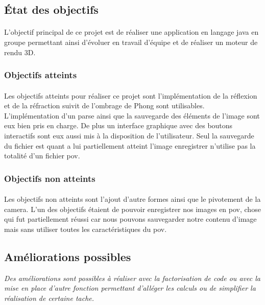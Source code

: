 \documentclass[12pt]{article}
\begin{document}
		\subsection{État des objectifs}
		
	\paragraph{}L'objectif principal de ce projet est de réaliser une application en langage java en groupe permettant ainsi d'évoluer en travail d'équipe et de réaliser un moteur de rendu 3D.
	
		\subsubsection{Objectifs atteints}
		
	\paragraph{} Les objectifs atteints  pour réaliser ce projet sont l'implémentation de la réflexion et de la réfraction suivit de l'ombrage de Phong sont utilisables. L'implémentation d'un parse ainsi que la sauvegarde des éléments de l'image sont eux bien pris en charge. De plus un interface graphique avec des boutons interactifs sont eux aussi mis à la disposition de l'utilisateur. Seul la sauvegarde du fichier est quant a lui partiellement atteint l'image enregistrer n'utilise pas la totalité d'un fichier pov. 
	
		\subsubsection{Objectifs non atteints}
		
	\paragraph{}Les objectifs non atteints sont l'ajout d'autre formes ainsi que le pivotement de la camera. L'un des objectifs étaient de pouvoir enregistrer nos images en pov, chose qui fut partiellement réussi car nous pouvons sauvegarder notre contenu d'image mais sans utiliser toutes les caractéristiques du pov.
		\subsection{Améliorations possibles}
		
	\textit{Des améliorations sont possibles à réaliser avec la factorisation de code ou avec la mise en place d'autre fonction permettant d'alléger les calculs ou de simplifier la réalisation de certaine tache. }
\end{document}
